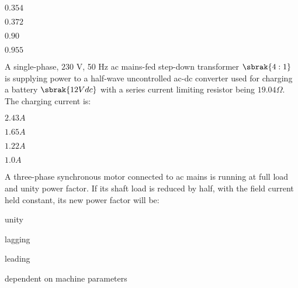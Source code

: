         \begin{enumerate}
                \begin{multicols}{2}
                \item $0.354$
                    \columnbreak
                \item $0.372$
                \end{multicols}
                \begin{multicols}{2}
                \item $0.90$
                    \columnbreak
                \item $0.955$
                \end{multicols}
        \end{enumerate}
    \item A single-phase, $230$ V, 50 Hz ac mains-fed step-down transformer $\sbrak{4:1}$ is supplying power to a half-wave uncontrolled ac-dc converter used for charging a battery $\sbrak{12 V dc}$ with a series current limiting resistor being $19.04 \Omega$. The charging current is:
        \begin{enumerate}
                \begin{multicols}{2}
                \item $2.43 A$
                    \columnbreak
                \item $1.65 A$
                \end{multicols}
                \begin{multicols}{2}
                \item $1.22 A$
                    \columnbreak
                \item $1.0 A$
                \end{multicols}
        \end{enumerate}
    \item A three-phase synchronous motor connected to ac mains is running at full load and unity power factor. If its shaft load is reduced by half, with the field current held constant, its new power factor will be:
        \begin{enumerate}
                \begin{multicols}{2}
                \item unity
                    \columnbreak
                \item lagging
                \end{multicols}
                \begin{multicols}{2}
                \item leading
                    \columnbreak
                \item dependent on machine parameters
                \end{multicols}
        \end{enumerate}
